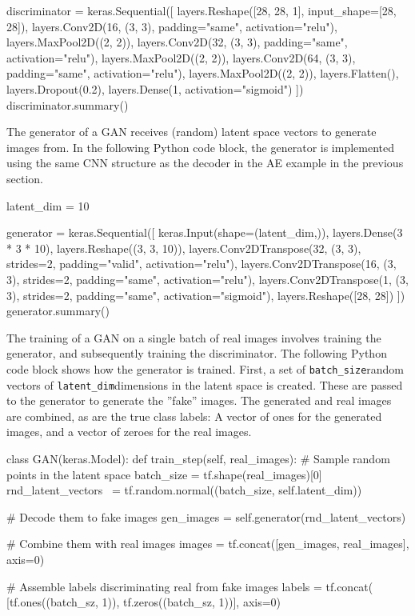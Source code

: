 \begin{pythoncode}
discriminator = keras.Sequential([
    layers.Reshape([28, 28, 1], input_shape=[28, 28]),
    layers.Conv2D(16, (3, 3), 
        padding="same", activation="relu"),
    layers.MaxPool2D((2, 2)),
    layers.Conv2D(32, (3, 3), 
        padding="same", activation="relu"),
    layers.MaxPool2D((2, 2)),
    layers.Conv2D(64, (3, 3), 
        padding="same", activation="relu"),
    layers.MaxPool2D((2, 2)),
    layers.Flatten(),
    layers.Dropout(0.2),
    layers.Dense(1, activation="sigmoid")
])
discriminator.summary()
\end{pythoncode}

The generator of a GAN receives (random) latent space vectors to generate images from. In the following Python code block, the generator is implemented using the same CNN structure as the decoder in the AE example in the previous section.

\begin{pythoncode}
latent_dim = 10

generator = keras.Sequential([
    keras.Input(shape=(latent_dim,)),
    layers.Dense(3 * 3 * 10),
    layers.Reshape((3, 3, 10)),
    layers.Conv2DTranspose(32, (3, 3), strides=2, 
        padding="valid", activation="relu"),
    layers.Conv2DTranspose(16, (3, 3), strides=2, 
        padding="same", activation="relu"),
    layers.Conv2DTranspose(1, (3, 3), strides=2, 
        padding="same", activation="sigmoid"),
    layers.Reshape([28, 28])
])
generator.summary()
\end{pythoncode}

The training of a GAN on a single batch of real images involves training the generator, and subsequently training the discriminator. The following Python code block shows how the generator is trained. First, a set of \small\texttt{batch\_size}\normalsize random vectors of \small\texttt{latent\_dim}\normalsize dimensions in the latent space is created. These are passed to the generator to generate the ''fake'' images. The generated and real images are combined, as are the true class labels: A vector of ones for the generated images, and a vector of zeroes for the real images. 

\begin{pythoncode}
class GAN(keras.Model):
    def train_step(self, real_images):
        # Sample random points in the latent space
        batch_size = tf.shape(real_images)[0]
        rnd_latent_vectors \
            = tf.random.normal((batch_size, self.latent_dim))

        # Decode them to fake images
        gen_images = self.generator(rnd_latent_vectors)

        # Combine them with real images
        images = tf.concat([gen_images, real_images], axis=0)

        # Assemble labels discriminating real from fake images
        labels = tf.concat(
            [tf.ones((batch_sz, 1)), 
            tf.zeros((batch_sz, 1))], axis=0)
\end{pythoncode}

